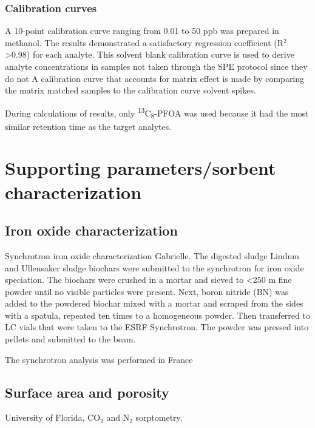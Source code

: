 \subsubsection{Calibration curves}
A 10-point calibration curve ranging from 0.01 to 50 ppb was prepared in methanol. The results demonstrated a satisfactory regression coefficient (R$^2$ \textgreater 0.98) for each analyte. This solvent blank calibration curve is used to derive analyte concentrations in samples not taken through the SPE protocol since they do not  A calibration curve that accounts for matrix effect is made by comparing the matrix matched samples to the calibration curve solvent spikes.

During calculations of results, only \textsuperscript{13}C\textsubscript{8}-PFOA was used because it had the most similar retention time as the target analytes. 


\section{Supporting parameters/sorbent characterization}

\subsection{Iron oxide characterization}
Synchrotron iron oxide characterization Gabrielle.
The digested sludge Lindum and Ullensaker sludge biochars were submitted to the synchrotron for iron oxide speciation. The biochars were crushed in a mortar and sieved to \textless 250 \textmu m fine powder until no visible particles were present. Next, boron nitride (BN) was added to the powdered biochar mixed with a mortar and scraped from the sides with a spatula, repeated ten times to a homogeneous powder. Then transferred to LC vials that were taken to the ESRF Synchrotron. The powder was pressed into pellets and submitted to the beam.

The synchrotron analysis was performed in France

\subsection{Surface area and porosity}
University of Florida, CO$_2$ and N$_2$ sorptometry. 

